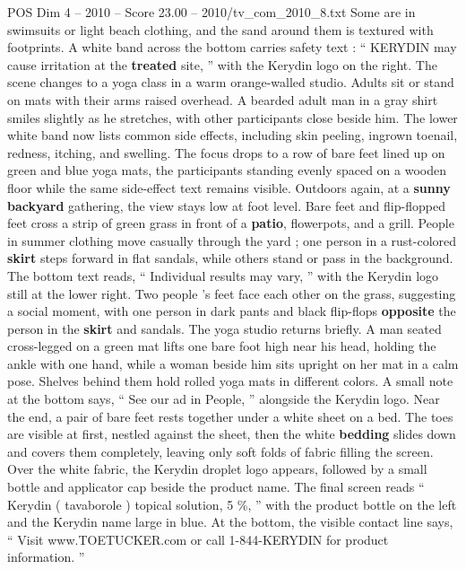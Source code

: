 \begin{textsample}{POS Dim 4 – 2010 – Score 23.00 – 2010/tv\_com\_2010\_8.txt}
Some are in swimsuits or light beach clothing, and the sand around them is textured with footprints.
A white band across the bottom carries safety text : “ KERYDIN may cause irritation at the \textbf{treated} site, ” with the Kerydin logo on the right.
The scene changes to a yoga class in a warm orange-walled studio.
Adults sit or stand on mats with their arms raised overhead.
A bearded adult man in a gray shirt smiles slightly as he stretches, with other participants close beside him.
The lower white band now lists common side effects, including skin peeling, ingrown toenail, redness, itching, and swelling.
The focus drops to a row of bare feet lined up on green and blue yoga mats, the participants standing evenly spaced on a wooden floor while the same side-effect text remains visible.
Outdoors again, at a \textbf{sunny} \textbf{backyard} gathering, the view stays low at foot level.
Bare feet and flip-flopped feet cross a strip of green grass in front of a \textbf{patio}, flowerpots, and a grill.
People in summer clothing move casually through the yard ; one person in a rust-colored \textbf{skirt} steps forward in flat sandals, while others stand or pass in the background.
The bottom text reads, “ Individual results may vary, ” with the Kerydin logo still at the lower right.
Two people ’s feet face each other on the grass, suggesting a social moment, with one person in dark pants and black flip-flops \textbf{opposite} the person in the \textbf{skirt} and sandals.
The yoga studio returns briefly.
A man seated cross-legged on a green mat lifts one bare foot high near his head, holding the ankle with one hand, while a woman beside him sits upright on her mat in a calm pose.
Shelves behind them hold rolled yoga mats in different colors.
A small note at the bottom says, “ See our ad in People, ” alongside the Kerydin logo.
Near the end, a pair of bare feet rests together under a white sheet on a bed.
The toes are visible at first, nestled against the sheet, then the white \textbf{bedding} slides down and covers them completely, leaving only soft folds of fabric filling the screen.
Over the white fabric, the Kerydin droplet logo appears, followed by a small bottle and applicator cap beside the product name.
The final screen reads “ Kerydin ( tavaborole ) topical solution, 5 \%, ” with the product bottle on the left and the Kerydin name large in blue.
At the bottom, the visible contact line says, “ Visit www.TOETUCKER.com or call 1-844-KERYDIN for product information. ”

\end{textsample}
